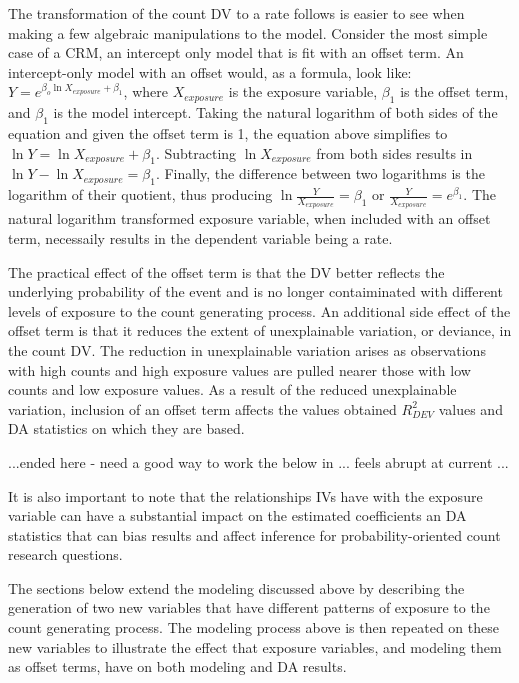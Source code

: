 \documentclass[ShortAfour,times,sageapa]{sagej}
\begin{document}
	The transformation of the count DV to a rate follows is easier to see when making a few algebraic manipulations to the model.
	Consider the most simple case of a CRM, an intercept only model that is fit with an offset term.
	An intercept-only model with an offset would, as a formula, look like: $Y = e^{\beta_o\ln X_{exposure} + \beta_1}$, where $X_{exposure}$ is the exposure variable, $\beta_1$ is the offset term, and $\beta_1$ is the model intercept.
	Taking the natural logarithm of both sides of the equation and given the offset term is 1, the equation above simplifies to $\ln Y = \ln X_{exposure} + \beta_1$.
	Subtracting $\ln X_{exposure}$ from both sides results in $\ln Y - \ln X_{exposure} = \beta_1$.
	Finally, the difference between two logarithms is the logarithm of their quotient, thus producing $\ln \frac{Y}{X_{exposure}} = \beta_1$ or $\frac{Y}{X_{exposure}} = e^{\beta_1}$.
	The natural logarithm transformed exposure variable, when included with an offset term, necessaily results in the dependent variable being a rate.
	
	The practical effect of the offset term is that the DV better reflects the underlying probability of the event and is no longer contaiminated with different levels of exposure to the count generating process.
	An additional side effect of the offset term is that it reduces the extent of unexplainable variation, or deviance, in the count DV.
	The reduction in unexplainable variation arises as observations with high counts and high exposure values are pulled nearer those with low counts and low exposure values.	
	As a result of the reduced unexplainable variation, inclusion of an offset term affects the values obtained $R^2_{DEV}$ values and DA statistics on which they are based.
	
	...ended here - need a good way to work the below in ... feels abrupt at current ...
	
	It is also important to note that the relationships IVs have with the exposure variable can have a substantial impact on the estimated coefficients an DA statistics that can bias results and affect inference for probability-oriented count research questions.
	
	The sections below extend the modeling discussed above by describing the generation of two new variables that have different patterns of exposure to the count generating process. 
	The modeling process above is then repeated on these new variables to illustrate the effect that exposure variables, and modeling them as offset terms, have on both modeling and DA results.
	
\end{document}

